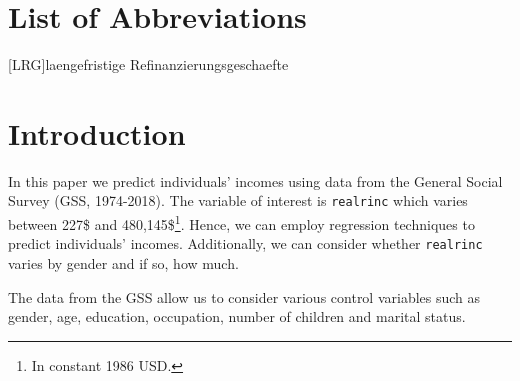 \documentclass[11pt,a4paper]{article}
\let\rmarkdownfootnote\footnote%
\def\footnote{\protect\rmarkdownfootnote}
\begin{document}
\newpage
\listoffigures
{}

\listoftables
{}

\section*{List of Abbreviations}

\begin{adjustwidth}{1.5em}{0pt}

\begin{acronym}[dummyyyy]
 [LRG]{laengefristige Refinanzierungsgeschaefte}

\end{acronym}

\end{adjustwidth}

\restoregeometry

\newpage
{}
\hypertarget{introduction}{%
\section{Introduction}\label{introduction}}

In this paper we predict individuals' incomes using data from the
General Social Survey (GSS, 1974-2018). The variable of interest is
\texttt{realrinc} which varies between 227\$ and
480,145\$\footnote{In constant 1986 USD.}. Hence, we can employ
regression techniques to predict individuals' incomes. Additionally, we
can consider whether \texttt{realrinc} varies by gender and if so, how
much.

The data from the GSS allow us to consider various control variables
such as gender, age, education, occupation, number of children and
marital status.
\end{document}
